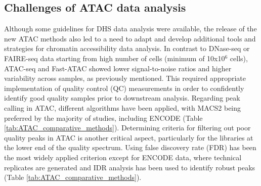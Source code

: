 \subsection{Challenges of ATAC data analysis}  
Although some guidelines for DHS data analysis were available, the release of the new ATAC methods also led to a need to adapt and develop additional tools and strategies for chromatin accessibility data analysis. In contrast to DNase-seq or FAIRE-seq data starting from high number of cells (minimum of 10x10$^6$ cells), ATAC-seq and Fast-ATAC showed lower signal-to-noise ratios and higher variability across samples, as previously mentioned. This required appropriate implementation of quality control (QC) measurements in order to confidently identify good quality samples prior to downstream analysis. Regarding peak calling in ATAC, different algorithms have been applied, with MACS2 being preferred by the majority of studies, including ENCODE (Table \ref{tab:ATAC_comparative_methods}). Determining criteria for filtering out poor quality peaks in ATAC is another critical aspect, particularly for the libraries at the lower end of the quality spectrum. Using false discovery rate (FDR) has been the most widely applied criterion except for ENCODE data, where technical replicates are generated and IDR analysis has been used to identify robust peaks (Table \ref{tab:ATAC_comparative_methods}). 


